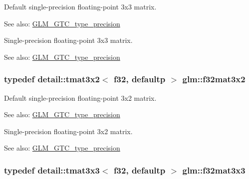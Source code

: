 Default single-precision floating-point 3x3 matrix. \begin{Desc}
\item[See also:]\hyperlink{group__gtc__type__precision}{GLM\_\-GTC\_\-type\_\-precision}\end{Desc}
Single-precision floating-point 3x3 matrix. \begin{Desc}
\item[See also:]\hyperlink{group__gtc__type__precision}{GLM\_\-GTC\_\-type\_\-precision} \end{Desc}
\hypertarget{group__gtc__type__precision_g43fa9ba1875db74cba2cea33321a77ff}{
\subsubsection[f32mat3x2]{\setlength{\rightskip}{0pt plus 5cm}typedef detail::tmat3x2$<$ f32, defaultp $>$ {\bf glm::f32mat3x2}}}
\label{group__gtc__type__precision_g43fa9ba1875db74cba2cea33321a77ff}


Default single-precision floating-point 3x2 matrix. \begin{Desc}
\item[See also:]\hyperlink{group__gtc__type__precision}{GLM\_\-GTC\_\-type\_\-precision}\end{Desc}
Single-precision floating-point 3x2 matrix. \begin{Desc}
\item[See also:]\hyperlink{group__gtc__type__precision}{GLM\_\-GTC\_\-type\_\-precision} \end{Desc}
\hypertarget{group__gtc__type__precision_g56465dc40dd0e35221f00bdf44fb7c2e}{
\subsubsection[f32mat3x3]{\setlength{\rightskip}{0pt plus 5cm}typedef detail::tmat3x3$<$ f32, defaultp $>$ {\bf glm::f32mat3x3}}}
\label{group__gtc__type__precision_g56465dc40dd0e35221f00bdf44fb7c2e}


